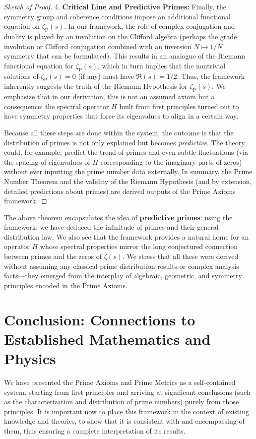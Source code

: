 \documentclass[11pt]{article}
\begin{document}
\begin{proof}[Sketch of Proof]
4. \textbf{Critical Line and Predictive Primes:} Finally, the symmetry group and coherence conditions impose an additional functional equation on $\zeta_{\mathrm{P}}(s)$. In our framework, the role of complex conjugation and duality is played by an involution on the Clifford algebra (perhaps the grade involution or Clifford conjugation combined with an inversion $N \mapsto 1/N$ symmetry that can be formulated). This results in an analogue of the Riemann functional equation for $\zeta_{\mathrm{P}}(s)$, which in turn implies that the nontrivial solutions of $\zeta_{\mathrm{P}}(s) = 0$ (if any) must have $\Re(s)=1/2$. Thus, the framework inherently suggests the truth of the Riemann Hypothesis for $\zeta_{\mathrm{P}}(s)$. We emphasize that in our derivation, this is not an assumed axiom but a consequence: the spectral operator $H$ built from first principles turned out to have symmetry properties that force its eigenvalues to align in a certain way.

Because all these steps are done within the system, the outcome is that the distribution of primes is not only explained but becomes \emph{predictive}. The theory could, for example, predict the trend of primes and even subtle fluctuations (via the spacing of eigenvalues of $H$ corresponding to the imaginary parts of zeros) without ever inputting the prime number data externally. In summary, the Prime Number Theorem and the validity of the Riemann Hypothesis (and by extension, detailed predictions about primes) are derived outputs of the Prime Axioms framework.
\end{proof}

The above theorem encapsulates the idea of \textbf{predictive primes}: using the framework, we have deduced the infinitude of primes and their general distribution law. We also see that the framework provides a natural home for an operator $H$ whose spectral properties mirror the long conjectured connection between primes and the zeros of $\zeta(s)$. We stress that all these were derived without assuming any classical prime distribution results or complex analysis facts---they emerged from the interplay of algebraic, geometric, and symmetry principles encoded in the Prime Axioms.

\section{Conclusion: Connections to Established Mathematics and Physics}
We have presented the Prime Axioms and Prime Metrics as a self-contained system, starting from first principles and arriving at significant conclusions (such as the characterization and distribution of prime numbers) purely from those principles. It is important now to place this framework in the context of existing knowledge and theories, to show that it is consistent with and encompassing of them, thus ensuring a complete interpretation of its results.
\end{document}
